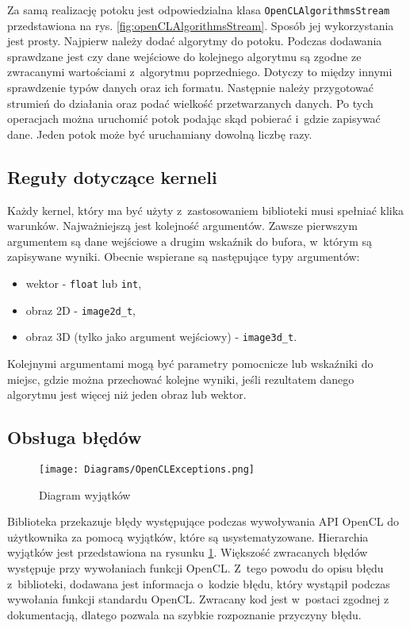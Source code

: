 Za samą realizację potoku jest odpowiedzialna klasa \texttt{OpenCLAlgorithmsStream} przedstawiona na rys. \ref{fig:openCLAlgorithmsStream}. Sposób jej wykorzystania jest prosty. Najpierw należy dodać algorytmy do potoku. Podczas dodawania sprawdzane jest czy dane wejściowe do kolejnego algorytmu są zgodne ze zwracanymi wartościami z~algorytmu poprzedniego. Dotyczy to między innymi sprawdzenie typów danych oraz ich formatu. Następnie należy przygotować strumień do działania oraz podać wielkość przetwarzanych danych. Po tych operacjach można uruchomić potok podając skąd pobierać i~gdzie zapisywać dane. Jeden potok może być uruchamiany dowolną liczbę razy.

\subsection{Reguły dotyczące kerneli}
\label{subsec:regulykerneli}

Każdy kernel, który ma być użyty z~zastosowaniem biblioteki musi spełniać klika warunków. Najważniejszą jest kolejność argumentów. Zawsze pierwszym argumentem są dane wejściowe a drugim wskaźnik do bufora, w~którym są zapisywane wyniki. Obecnie wspierane są następujące typy argumentów:
\begin{itemize}
\item wektor - \texttt{float\*} lub \texttt{int\*},
\item obraz 2D - \texttt{image2d\_t},
\item obraz 3D (tylko jako argument wejściowy) - \texttt{image3d\_t}.
\end{itemize}
Kolejnymi argumentami mogą być parametry pomocnicze lub wskaźniki do miejsc, gdzie można przechować kolejne wyniki, jeśli rezultatem danego algorytmu jest więcej niż jeden obraz lub wektor.

\subsection{Obsługa błędów}
\label{subsec:obslugabledow}


\begin{figure}
\begin{center}
\texttt{[image: Diagrams/OpenCLExceptions.png]}
\end{center}
\caption{Diagram wyjątków}
\label{fig:diagramwyjatkow}
\end{figure}

Biblioteka przekazuje błędy występujące podczas wywoływania API OpenCL do użytkownika za pomocą wyjątków, które są usystematyzowane. Hierarchia wyjątków jest przedstawiona na rysunku \ref{fig:diagramwyjatkow}. Większość zwracanych błędów występuje przy wywołaniach funkcji OpenCL. Z~tego powodu do opisu błędu z~biblioteki, dodawana jest informacja o~kodzie błędu, który wystąpił podczas wywołania funkcji standardu OpenCL. Zwracany kod jest w~postaci zgodnej z dokumentacją, dlatego pozwala na szybkie rozpoznanie przyczyny błędu.

